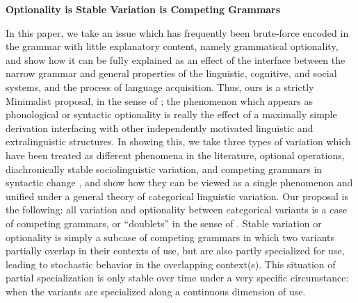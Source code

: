 \documentclass[a4paper,aps,prl,12pt,tightenlines,superscriptaddress]{revtex4}
\title{}%
\begin{document}
\begin{center} \textbf{Optionality is Stable Variation is Competing Grammars}  \end{center}


\noindent In this paper, we take an issue which has frequently been brute-force encoded in the grammar with little explanatory content, namely grammatical optionality, and show how it can be fully explained as an effect of the interface between the narrow grammar and general properties of the linguistic, cognitive, and social systems, and the process of language acquisition. 
Thus, ours is a strictly Minimalist proposal, in the sense of \citep[][inter alia]{chomsky1993, chomsky2001}; the phenomenon which appears as phonological or syntactic optionality is really the effect of a maximally simple derivation interfacing with other independently motivated linguistic and extralinguistic structures. In showing this, we take three types of variation which have been treated as different phenomena in the literature, optional operations, diachronically stable sociolinguistic variation, and competing grammars in syntactic change \citep[][]{kroch1989}, and show how they can be viewed as a single phenomenon and unified under a general theory of categorical linguistic variation. 
Our proposal is the following: all variation and optionality between categorical variants is a case of competing grammars, or ``doublets'' in the sense of \citet{kroch1994}. 
Stable variation or optionality is simply a subcase of competing grammars in which two variants partially overlap in their contexts of use, but are also partly specialized for use, leading to stochastic behavior in the overlapping context(s). 
This situation of partial specialization is only stable over time under a very specific circumstance: when the variants are specialized along a continuous dimension of use.%
\end{document}
